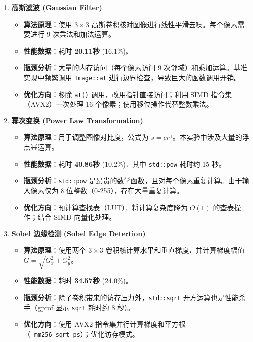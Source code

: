 \documentclass[a4paper]{article}
\begin{document}
\begin{enumerate}
    \item \textbf{高斯滤波 (Gaussian Filter)}
    \begin{itemize}
        \item \textbf{算法原理}：使用 $3 \times 3$ 高斯卷积核对图像进行线性平滑去噪。每个像素需要进行 9 次乘法和加法运算。
        \item \textbf{性能数据}：耗时 \textbf{20.11秒} (16.1\%)。
        \item \textbf{瓶颈分析}：大量的内存访问（每个像素访问 9 次邻域）和乘加运算。基准实现中频繁调用 \texttt{Image::at} 进行边界检查，导致巨大的函数调用开销。
        \item \textbf{优化方向}：移除 \texttt{at()} 调用，改用指针直接访问；利用 SIMD 指令集（AVX2）一次处理 16 个像素；使用移位操作代替整数乘法。
    \end{itemize}

    \item \textbf{幂次变换 (Power Law Transformation)}
    \begin{itemize}
        \item \textbf{算法原理}：用于调整图像对比度，公式为 $s = c r^\gamma$。本实验中涉及大量的浮点幂运算。
        \item \textbf{性能数据}：耗时 \textbf{40.86秒} (10.2\%)，其中 \texttt{std::pow} 耗时约 15 秒。
        \item \textbf{瓶颈分析}：\texttt{std::pow} 是昂贵的数学函数，且对每个像素重复计算。由于输入像素仅为 8 位整数（0-255），存在大量重复计算。
        \item \textbf{优化方向}：预计算查找表（LUT），将计算复杂度降为 $O(1)$ 的查表操作；结合 SIMD 向量化处理。
    \end{itemize}

    \item \textbf{Sobel 边缘检测 (Sobel Edge Detection)}
    \begin{itemize}
        \item \textbf{算法原理}：使用两个 $3 \times 3$ 卷积核计算水平和垂直梯度，并计算梯度幅值 $G = \sqrt{G_x^2 + G_y^2}$。
        \item \textbf{性能数据}：耗时 \textbf{34.57秒} (24.0\%)。
        \item \textbf{瓶颈分析}：除了卷积带来的访存压力外，\texttt{std::sqrt} 开方运算也是性能杀手（gprof 显示 \texttt{sqrt} 耗时约 8 秒）。
        \item \textbf{优化方向}：使用 AVX2 指令集并行计算梯度和平方根（\texttt{\_mm256\_sqrt\_ps}）；优化访存模式。
    \end{itemize}


\end{enumerate}
\end{document}
